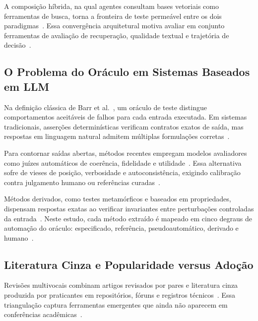 \documentclass[sigconf]{acmart}
\begin{document}
A composição híbrida, na qual agentes consultam bases vetoriais como ferramentas de busca, torna a fronteira de teste permeável entre os dois paradigmas~\cite{gao2023ragsurvey,yehudai2025agents}. Essa convergência arquitetural motiva avaliar em conjunto ferramentas de avaliação de recuperação, qualidade textual e trajetória de decisão~\cite{es2024ragas,jimenez2024swebench}.

\subsection{O Problema do Oráculo em Sistemas Baseados em LLM}
\label{sec:fund-oraculo}

Na definição clássica de Barr et al.~\cite{barr2015oracle}, um oráculo de teste distingue comportamentos aceitáveis de falhos para cada entrada executada. Em sistemas tradicionais, asserções determinísticas verificam contratos exatos de saída, mas respostas em linguagem natural admitem múltiplas formulações corretas~\cite{zhang2022mltesting,chang2024survey}.

Para contornar saídas abertas, métodos recentes empregam modelos avaliadores como juízes automáticos de coerência, fidelidade e utilidade~\cite{zheng2023judging,es2024ragas}. Essa alternativa sofre de vieses de posição, verbosidade e autoconsistência, exigindo calibração contra julgamento humano ou referências curadas~\cite{zheng2023judging,chang2024survey}.

Métodos derivados, como testes metamórficos e baseados em propriedades, dispensam respostas exatas ao verificar invariantes entre perturbações controladas da entrada~\cite{barr2015oracle,zhang2022mltesting}. Neste estudo, cada método extraído é mapeado em cinco degraus de automação do oráculo: especificado, referência, pseudoautomático, derivado e humano~\cite{barr2015oracle,zheng2023judging}.

\subsection{Literatura Cinza e Popularidade versus Adoção}
\label{sec:fund-cinza}

Revisões multivocais combinam artigos revisados por pares e literatura cinza produzida por praticantes em repositórios, fóruns e registros técnicos~\cite{garousi2019guidelines,cruzes2011thematic}. Essa triangulação captura ferramentas emergentes que ainda não aparecem em conferências acadêmicas~\cite{garousi2019guidelines,raulamo2017choosing}.
\end{document}

